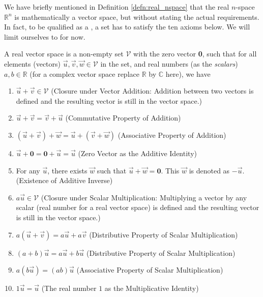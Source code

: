 We have briefly mentioned in Definition \ref{defn:real_nspace} that the real $n$-space $\mathbb{R}^n$ is mathematically a vector space, but without stating the actual requirements. In fact, to be qualified as a , a set has to satisfy the ten axioms below. We will limit ourselves to  for now.
\begin{defn}
\label{defn:realvecspaceaxiom}
A real vector space is a non-empty set $\mathcal{V}$ with the zero vector \textbf{0}, such that for all elements (vectors) $\vec{u}, \vec{v}, \vec{w} \in \mathcal{V}$ in the set, and real numbers (as the \textit{scalars}) $a, b \in \mathbb{R}$ (for a complex vector space replace $\mathbb{R}$ by $\mathbb{C}$ here), we have
\begin{enumerate}
\item $\vec{u} + \vec{v} \in \mathcal{V}$ (Closure under Vector Addition: Addition between two vectors is defined and the resulting vector is still in the vector space.)
\item $\vec{u} + \vec{v} = \vec{v} + \vec{u}$ (Commutative Property of Addition)
\item $(\vec{u} + \vec{v}) + \vec{w} = \vec{u} + (\vec{v} + \vec{w})$ (Associative Property of Addition)
\item $\vec{u} + \textbf{0} = \textbf{0} + \vec{u} = \vec{u}$ (Zero Vector as the Additive Identity)
\item For any $\vec{u}$, there exists $\vec{w}$ such that $\vec{u} + \vec{w} = \textbf{0}$. This $\vec{w}$ is denoted as $-\vec{u}$. (Existence of Additive Inverse)
\item $a\vec{u} \in \mathcal{V}$ (Closure under Scalar Multiplication: Multiplying a vector by any scalar (real number for a real vector space) is defined and the resulting vector is still in the vector space.)
\item $a(\vec{u} + \vec{v}) = a\vec{u} + a\vec{v}$ (Distributive Property of Scalar Multiplication)
\item $(a+b)\vec{u} = a\vec{u} + b\vec{u}$ (Distributive Property of Scalar Multiplication)
\item $a(b\vec{u}) = (ab)\vec{u}$ (Associative Property of Scalar Multiplication)
\item $1\vec{u} = \vec{u}$ (The real number $1$ as the Multiplicative Identity)
\end{enumerate}
\end{defn}
